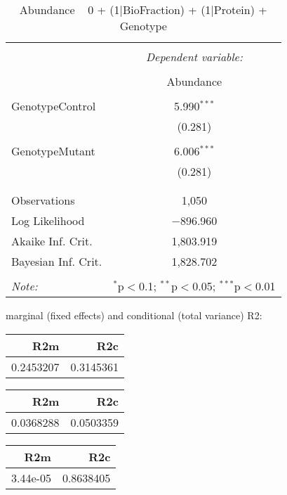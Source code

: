 \documentclass[11pt]{report}
\begin{document}
\begin{table}[!htbp] \centering 
  \caption{Abundance ~ 0 + (1|BioFraction) + (1|Protein) + Genotype} 
  \label{} 
\begin{tabular}{@{\extracolsep{5pt}}lc} 
\\[-1.8ex]\hline 
\hline \\[-1.8ex] 
 & \multicolumn{1}{c}{\textit{Dependent variable:}} \\ 
\cline{2-2} 
\\[-1.8ex] & Abundance \\ 
\hline \\[-1.8ex] 
 GenotypeControl & 5.990$^{***}$ \\ 
  & (0.281) \\ 
  & \\ 
 GenotypeMutant & 6.006$^{***}$ \\ 
  & (0.281) \\ 
  & \\ 
\hline \\[-1.8ex] 
Observations & 1,050 \\ 
Log Likelihood & $-$896.960 \\ 
Akaike Inf. Crit. & 1,803.919 \\ 
Bayesian Inf. Crit. & 1,828.702 \\ 
\hline 
\hline \\[-1.8ex] 
\textit{Note:}  & \multicolumn{1}{r}{$^{*}$p$<$0.1; $^{**}$p$<$0.05; $^{***}$p$<$0.01} \\ 
\end{tabular} 
\end{table} 
marginal (fixed effects) and conditional (total variance) R2:

\begin{tabular}{r|r}
\hline
R2m & R2c\\
\hline
0.2453207 & 0.3145361\\
\hline
\end{tabular}

\begin{tabular}{r|r}
\hline
R2m & R2c\\
\hline
0.0368288 & 0.0503359\\
\hline
\end{tabular}

\begin{tabular}{r|r}
\hline
R2m & R2c\\
\hline
3.44e-05 & 0.8638405\\
\hline
\end{tabular}
\end{document}
